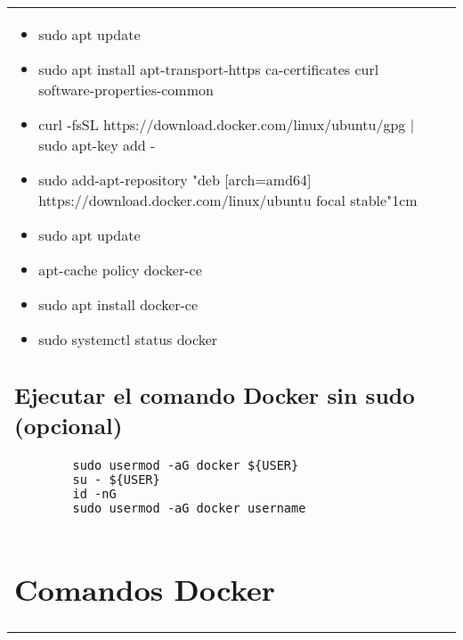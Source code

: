 \documentclass[letterpaper,11pt]{article}
\begin{document}
\begin{tabular*}{7in}{l@{\extracolsep{\fill}}r}
    \begin{itemize}
        \item sudo apt update
        \item sudo apt install apt-transport-https ca-certificates curl software-properties-common
        \item curl -fsSL https://download.docker.com/linux/ubuntu/gpg | sudo apt-key add -
        \item sudo add-apt-repository "deb [arch=amd64] https://download.docker.com/linux/ubuntu focal stable"1cm
        \item sudo apt update
        \item apt-cache policy docker-ce
        \item sudo apt install docker-ce
        \item sudo systemctl status docker
    
    \end{itemize}
    
    \subsection{Ejecutar el comando Docker sin sudo (opcional)}
    
    \begin{lstlisting}
        sudo usermod -aG docker ${USER}
        su - ${USER}
        id -nG
        sudo usermod -aG docker username
    
    \end{lstlisting}
    
    \section{Comandos Docker}\label{comansDocker}
    

\end{tabular*}
\end{document}
